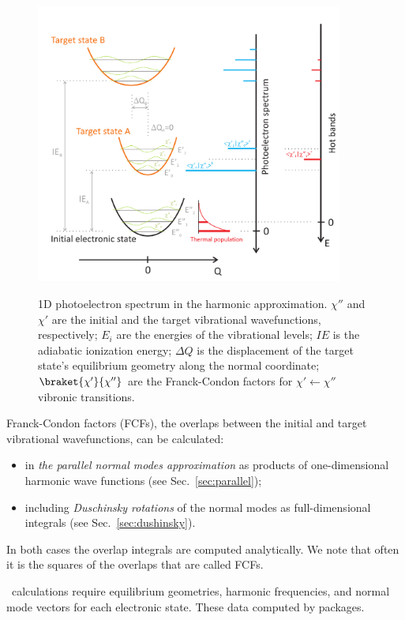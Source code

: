 \documentclass[11pt]{article}
\begin{document}
\begin{figure}[h!]
  \centering
  \caption{1D photoelectron spectrum in the harmonic approximation.
$\chi''$ and $\chi'$ are the initial and the target vibrational wavefunctions, respectively;
$E_i$ are the energies of the vibrational levels;
$IE$ is the adiabatic ionization energy;
$\Delta Q$ is the displacement of the
target state's equilibrium geometry along the normal coordinate;
$\braket{\chi'}{\chi''}$ are the Franck-Condon factors for $\chi'\leftarrow \chi''$
vibronic transitions.}
  \includegraphics[width=0.9\textwidth]{fcfs_1d.pdf}
  \label{fig:fcfs}
\end{figure}

Franck-Condon factors (FCFs), the overlaps between the initial and target
vibrational wavefunctions, can be calculated:
\begin{itemize} 
\item in {\em the parallel normal modes approximation} as products of 
one-dimensional harmonic wave functions (see Sec.~\ref{sec:parallel});
\item including {\em Duschinsky rotations} of the normal modes as full-dimensional integrals (see Sec.~\ref{sec:dushinsky}).
\end{itemize}
In both cases the overlap integrals are computed analytically.  We note that often it is the squares of the
overlaps that are called FCFs.

\ezFCF\ calculations require equilibrium geometries, harmonic frequencies, 
and normal mode vectors for each electronic state. These data computed by \ai packages. 
\end{document}
